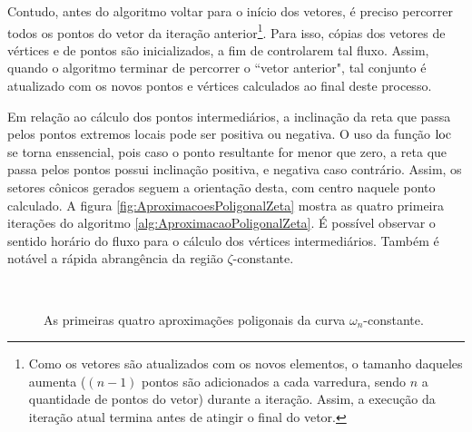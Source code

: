 Contudo, antes do algoritmo voltar para o início dos vetores, é preciso percorrer todos os pontos do vetor da iteração anterior\footnote{Como os vetores são atualizados com os novos elementos, o tamanho daqueles aumenta ($(n-1)$ pontos são adicionados a cada varredura, sendo $n$ a quantidade de pontos do vetor) durante a iteração. Assim, a execução da iteração atual termina antes de atingir o final do vetor.}. Para isso, cópias dos vetores de vértices e de pontos são inicializados, a fim de controlarem tal fluxo. Assim, quando o algoritmo terminar de percorrer o ``vetor anterior", tal conjunto é atualizado com os novos pontos e vértices calculados ao final deste processo.

Em relação ao cálculo dos pontos intermediários, a inclinação da reta que passa pelos pontos extremos locais pode ser positiva ou negativa. O uso da função $\operatorname{loc}$ se torna enssencial, pois caso o ponto resultante for menor que zero, a reta que passa pelos pontos possui inclinação positiva, e negativa caso contrário\cite{WISNIEWSKI2019}. Assim, os setores cônicos gerados seguem a orientação desta, com centro naquele ponto calculado. A figura \ref{fig:AproximacoesPoligonalZeta} mostra as quatro primeira iterações do algoritmo \ref{alg:AproximacaoPoligonalZeta}. É possível observar o sentido horário do fluxo para o cálculo dos vértices intermediários. Também é notável a rápida abrangência da região $\zeta$-constante.

\begin{figure}[!ht]
  \centering
  \begin{subfigure}[t]{0.4\columnwidth}
      
      \caption{}
      \label{subfig:AproximacaoPoligonalWn1}
  \end{subfigure}
  \begin{subfigure}[t]{0.4\columnwidth}
      
      \caption{}
      \label{subfig:AproximacaoPoligonalWn2}
  \end{subfigure}
  \\
  \begin{subfigure}[t]{0.4\columnwidth}
    
    \caption{}
    \label{subfig:AproximacaoPoligonalWn3}
  \end{subfigure}
  \begin{subfigure}[t]{0.4\columnwidth}
    
    \caption{}
    \label{subfig:AproximacaoPoligonalWn4}
  \end{subfigure}
  \caption{As primeiras quatro aproximações poligonais da curva $\omega_n$-constante.}
  \label{fig:AproximacoesPoligonalWn}
\end{figure}

